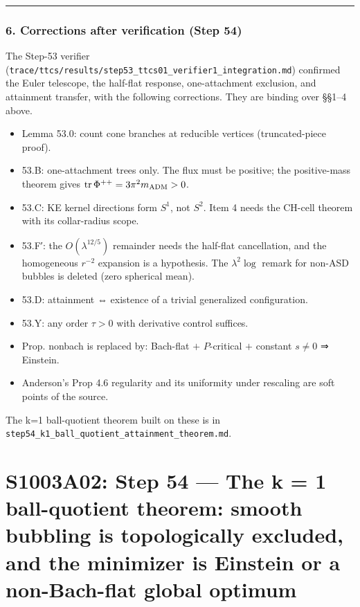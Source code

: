 \documentclass[
  10pt,
]{report}
\providecommand{\tightlist}{%
  \setlength{\itemsep}{0pt}\setlength{\parskip}{0pt}}
\begin{document}
\begin{center}\rule{0.5\linewidth}{0.5pt}\end{center}

\hypertarget{corrections-after-verification-step-54}{%
\subsection{6. Corrections after verification (Step
54)}\label{corrections-after-verification-step-54}}

The Step-53 verifier
(\texttt{trace/ttcs/results/step53\_ttcs01\_verifier1\_integration.md})
confirmed the Euler telescope, the half-flat response, one-attachment
exclusion, and attainment transfer, with the following corrections. They
are binding over §§1--4 above.

\begin{itemize}
\tightlist
\item
  Lemma 53.0: count cone branches at reducible vertices (truncated-piece
  proof).
\item
  53.B: one-attachment trees only. The flux must be positive; the
  positive-mass theorem gives
  \(\operatorname{tr}\Phi^{++}=3\pi^2m_{\rm ADM}>0\).
\item
  53.C: KE kernel directions form \(S^1\), not \(S^2\). Item 4 needs the
  CH-cell theorem with its collar-radius scope.
\item
  53.F′: the \(O(\lambda^{12/5})\) remainder needs the half-flat
  cancellation, and the homogeneous \(r^{-2}\) expansion is a
  hypothesis. The \(\lambda^2\log\) remark for non-ASD bubbles is
  deleted (zero spherical mean).
\item
  53.D: attainment ⇔ existence of a trivial generalized configuration.
\item
  53.Y: any order \(\tau>0\) with derivative control suffices.
\item
  Prop. nonbach is replaced by: Bach-flat \(+\) \(P\)-critical \(+\)
  constant \(s\neq0\) ⇒ Einstein.
\item
  Anderson's Prop 4.6 regularity and its uniformity under rescaling are
  soft points of the source.
\end{itemize}

The k=1 ball-quotient theorem built on these is in
\texttt{step54\_k1\_ball\_quotient\_attainment\_theorem.md}.

\hypertarget{s1003a02-step-54-the-k-1-ball-quotient-theorem-smooth-bubbling-is-topologically-excluded-and-the-minimizer-is-einstein-or-a-non-bach-flat-global-optimum}{%
\chapter{S1003A02: Step 54 --- The k = 1 ball-quotient theorem: smooth
bubbling is topologically excluded, and the minimizer is Einstein or a
non-Bach-flat global
optimum}\label{s1003a02-step-54-the-k-1-ball-quotient-theorem-smooth-bubbling-is-topologically-excluded-and-the-minimizer-is-einstein-or-a-non-bach-flat-global-optimum}}
\end{document}
